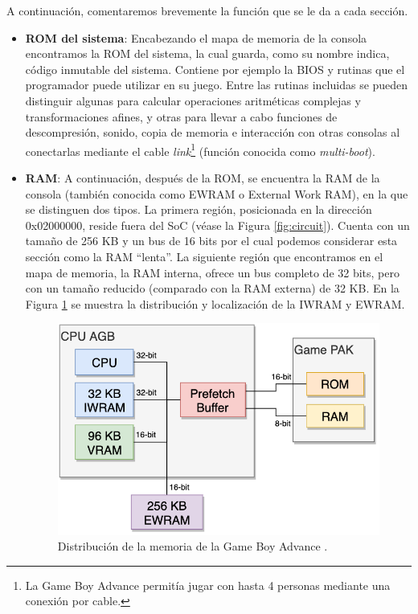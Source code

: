 A continuación, comentaremos brevemente la función que se le da a cada sección.

\begin{itemize}
	\item \textbf{ROM del sistema}: Encabezando el mapa de memoria de la consola encontramos la ROM del sistema, la cual guarda, como su nombre indica, código inmutable del sistema. Contiene por ejemplo la BIOS y rutinas que el programador puede utilizar en su juego. Entre las rutinas incluidas se pueden distinguir algunas para calcular operaciones  aritméticas complejas y transformaciones afines, y otras para llevar a cabo funciones de descompresión, sonido, copia de memoria e interacción con otras consolas al conectarlas mediante el cable \textit{link}\footnote{La Game Boy Advance permitía jugar con hasta 4 personas mediante una conexión por cable.} (función conocida como \textit{multi-boot}).
	\item \textbf{RAM}: A continuación, después de la ROM, se encuentra la RAM de la consola (también conocida como EWRAM o External Work RAM), en la que se distinguen dos tipos. La primera región, posicionada en la dirección 0x02000000, reside fuera del SoC (véase la Figura \ref{fig:circuit}). Cuenta con un tamaño de 256 KB y un bus de 16 bits por el cual podemos considerar esta sección como la RAM ``lenta''. La siguiente región que encontramos en el mapa de memoria, la RAM interna, ofrece un bus completo de 32 bits, pero con un tamaño reducido (comparado con la RAM externa) de 32 KB. En la Figura \ref{fig:distribucion_1} se muestra la distribución y localización de la IWRAM y EWRAM. \\

	\begin{figure}[h]
	    \centering
	    \includegraphics[width=.5\textwidth]{capitulos/capitulo2/distribucion.png}
	    \caption{Distribución de la memoria de la Game Boy Advance \cite{bib:rodrigo}.}
	    \label{fig:distribucion_1}
	\end{figure}


\end{itemize}
